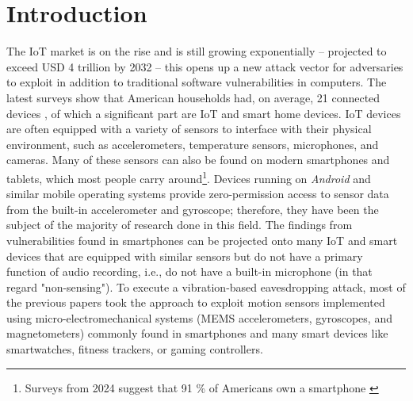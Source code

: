 \documentclass[sigconf, nonacm]{acmart}
\begin{document}



\maketitle

\section{Introduction}
The IoT market is on the rise and is still growing exponentially -- projected to exceed USD 4 trillion by 2032 \cite{FortuneBusinessInsights2024} -- this opens up a new attack vector for adversaries to exploit in addition to traditional software vulnerabilities in computers.
The latest surveys show that American households had, on average, 21 connected devices \cite{DeloitteConnectedConsumer2023}, of which a significant part are IoT and smart home devices.
IoT devices are often equipped with a variety of sensors to interface with their physical environment, such as accelerometers, temperature sensors, microphones, and cameras.
Many of these sensors can also be found on modern smartphones and tablets, which most people carry around\footnote{Surveys from 2024 suggest that 91 \% of Americans own a smartphone \cite{PewResearchMobileFactSheet2024}}. Devices running on \textit{Android} and similar mobile operating systems provide zero-permission access to sensor data from the built-in accelerometer and gyroscope; therefore, they have been the subject of the majority of research done in this field.
The findings from vulnerabilities found in smartphones can be projected onto many IoT and smart devices that are equipped with similar sensors but do not have a primary function of audio recording, i.e., do not have a built-in microphone (in that regard "non-sensing").
To execute a vibration-based eavesdropping attack, most of the previous papers took the approach to exploit motion sensors implemented using micro-electromechanical systems (MEMS accelerometers, gyroscopes, and magnetometers) commonly found in smartphones and many smart devices like smartwatches, fitness trackers, or gaming controllers.
\end{document}
